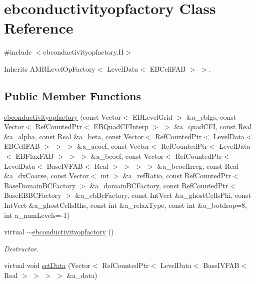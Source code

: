\hypertarget{classebconductivityopfactory}{}\section{ebconductivityopfactory Class Reference}
\label{classebconductivityopfactory}


{\ttfamily \#include $<$ebconductivityopfactory.\+H$>$}



Inherits A\+M\+R\+Level\+Op\+Factory$<$ Level\+Data$<$ E\+B\+Cell\+F\+A\+B $>$ $>$.

\subsection*{Public Member Functions}
\begin{DoxyCompactItemize}
\item 
\hyperlink{classebconductivityopfactory_a2c3aeb45fe38f6623b04051a4e43dfe8}{ebconductivityopfactory} (const Vector$<$ E\+B\+Level\+Grid $>$ \&a\+\_\+eblgs, const Vector$<$ Ref\+Counted\+Ptr$<$ E\+B\+Quad\+C\+F\+Interp $>$ $>$ \&a\+\_\+quad\+C\+FI, const Real \&a\+\_\+alpha, const Real \&a\+\_\+beta, const Vector$<$ Ref\+Counted\+Ptr$<$ Level\+Data$<$ E\+B\+Cell\+F\+AB $>$ $>$ $>$ \&a\+\_\+acoef, const Vector$<$ Ref\+Counted\+Ptr$<$ Level\+Data$<$ E\+B\+Flux\+F\+AB $>$ $>$ $>$ \&a\+\_\+bcoef, const Vector$<$ Ref\+Counted\+Ptr$<$ Level\+Data$<$ Base\+I\+V\+F\+AB$<$ Real $>$ $>$ $>$ $>$ \&a\+\_\+bcoef\+Irreg, const Real \&a\+\_\+dx\+Coarse, const Vector$<$ int $>$ \&a\+\_\+ref\+Ratio, const Ref\+Counted\+Ptr$<$ Base\+Domain\+B\+C\+Factory $>$ \&a\+\_\+domain\+B\+C\+Factory, const Ref\+Counted\+Ptr$<$ Base\+E\+B\+B\+C\+Factory $>$ \&a\+\_\+eb\+Bc\+Factory, const Int\+Vect \&a\+\_\+ghost\+Cells\+Phi, const Int\+Vect \&a\+\_\+ghost\+Cells\+Rhs, const int \&a\+\_\+relax\+Type, const int \&a\+\_\+botdrop=8, int a\+\_\+num\+Levels=-\/1)
\item 
virtual \hyperlink{classebconductivityopfactory_a82cb78e6696b2a60351ca09650a12ba0}{$\sim$ebconductivityopfactory} ()
\begin{DoxyCompactList}\small\item\em Destructor. \end{DoxyCompactList}\item 
virtual void \hyperlink{classebconductivityopfactory_ab70ab2f9cfcea51fbcb9a58a5a91038d}{set\+Data} (Vector$<$ Ref\+Counted\+Ptr$<$ Level\+Data$<$ Base\+I\+V\+F\+AB$<$ Real $>$ $>$ $>$ $>$ \&a\+\_\+data)

\end{DoxyCompactItemize}
